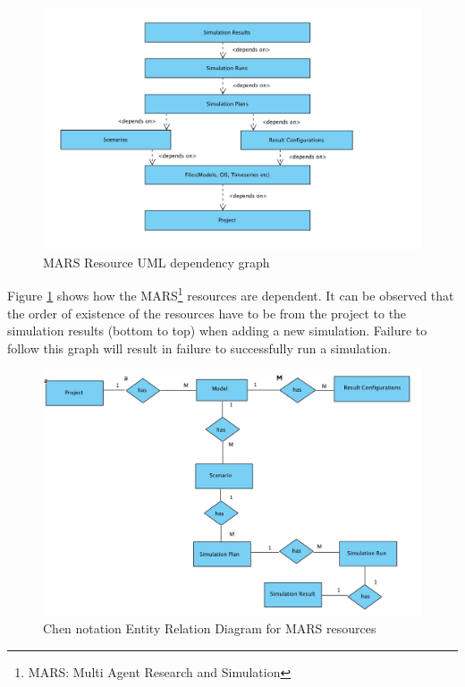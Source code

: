         \begin{figure}[H]
            \centering \includegraphics[scale=0.6]{grafiken/marsDependency.png}
            \caption{MARS Resource UML dependency graph \cite{DepDiagram}}
            \label{fig:marsDependency}
        \end{figure}
        
        Figure \ref{fig:marsDependency} shows how the MARS\footnote{MARS: Multi Agent Research and Simulation} 
        resources are dependent. It can be observed
        that the order of existence of the resources have to be from the project to the simulation results 
        (bottom to top) when adding a new simulation. Failure to follow this graph will result in failure to
        successfully run a simulation.

        \begin{figure}[H]
            \centering \includegraphics[scale=0.6]{grafiken/ERMars.png}
            \caption{Chen notation Entity Relation Diagram for MARS resources}
            \label{fig:ERMars}
        \end{figure}
        
